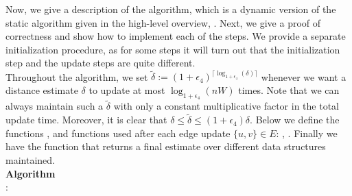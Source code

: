 Now, we give a description of the algorithm, which is a dynamic version of the static algorithm given in the high-level overview, . Next, we give a proof of correctness and show how to implement each of the steps. We provide a separate initialization procedure, as for some steps it will turn out that the initialization step and the update steps are quite different.\\
Throughout the algorithm, we set $\tilde\delta := (1+\epsilon_4)^{\lceil \log_{1+\epsilon_4}(\delta)\rceil}$ whenever we want a distance estimate $\delta$ to update at most $\log_{1+\epsilon_4}(nW)$ times. Note that we can always maintain such a $\tilde \delta$ with only a constant multiplicative factor in the total update time. Moreover, it is clear that $\delta \leq \tilde \delta \leq (1+\epsilon_4)\delta$.
Below we define the functions \Initialization{}, and functions used after each edge update $\{u,v\}\in E$: , . Finally we have the \Query{} function that returns a final estimate over different data structures maintained. 
\\ 

\noindent
\textbf{Algorithm} \\
\Initialization{}:

